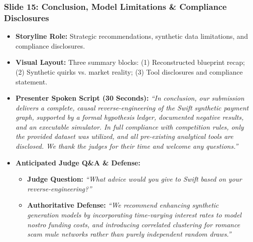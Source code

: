 \documentclass[11pt,a4paper]{article}
\begin{document}
\subsubsection{Slide 15: Conclusion, Model Limitations \& Compliance Disclosures}
\begin{itemize}
    \item \textbf{Storyline Role:} Strategic recommendations, synthetic data limitations, and compliance disclosures.
    \item \textbf{Visual Layout:} Three summary blocks: (1) Reconstructed blueprint recap; (2) Synthetic quirks vs. market reality; (3) Tool disclosures and compliance statement.
    \item \textbf{Presenter Spoken Script (30 Seconds):}
    \textit{``In conclusion, our submission delivers a complete, causal reverse-engineering of the Swift synthetic payment graph, supported by a formal hypothesis ledger, documented negative results, and an executable simulator. In full compliance with competition rules, only the provided dataset was utilized, and all pre-existing analytical tools are disclosed. We thank the judges for their time and welcome any questions.''}
    \item \textbf{Anticipated Judge Q\&A \& Defense:}
    \begin{itemize}
        \item \textbf{Judge Question:} \textit{``What advice would you give to Swift based on your reverse-engineering?''}
        \item \textbf{Authoritative Defense:} \textit{``We recommend enhancing synthetic generation models by incorporating time-varying interest rates to model nostro funding costs, and introducing correlated clustering for romance scam mule networks rather than purely independent random draws.''}
    \end{itemize}
\end{itemize}
\end{document}
